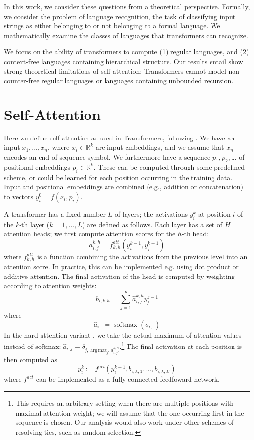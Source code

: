 \documentclass[11pt,a4paper]{article}
\DeclareMathOperator*{\argmax}{arg\,max}
\begin{document}
In this work, we consider these questions from a theoretical perspective.
Formally, we consider the problem of language recognition, the task of classifying input strings as either belonging to or not belonging to a formal language.
We mathematically examine the classes of languages that transformers can recognize.

We focus on the ability of transformers to compute (1) regular languages, and (2) context-free languages containing hierarchical structure.
Our results entail show strong theoretical limitations of self-attention:
Transformers cannot model non-counter-free regular languages or languages containing unbounded recursion.


\section{Self-Attention}
Here we define self-attention as used in Transformers, following \cite{vaswani2017attention}.
We have an input $x_1,...,x_n$, where $x_i \in \mathbb{R}^k$ are input embeddings, and we assume that $x_n$ encodes an end-of-sequence symbol.
We furthermore have a sequence $p_1, p_2, ...$ of positional embeddings $p_i \in \mathbb{R}^k$. These can be computed through some predefined scheme, or could be learned for each position occurring in the training data.
Input and positional embeddings are combined (e.g., addition or concatenation) to vectors $y_i^0 = f(x_i, p_i)$.

A transformer has a fixed number $L$ of layers; the activations $y_i^k$ at position $i$ of the $k$-th layer ($k=1, ..., L$) are defined as follows.
Each layer has a set of $H$ attention heads; we first compute attention scores for the $h$-th head:
\begin{equation}
    a_{i,j}^{k,h} = f^{att}_{k,h}(y_i^{k-1}, y_j^{k-1})
\end{equation}
where $f^{att}_{k,h}$ is a function combining the activations from the previous level into an attention score.
In practice, this can be implemented e.g. using dot product or additive attention.
The final activation of the head is computed by weighting according to attention weights:
\begin{equation}
    b_{i,k,h} = \sum_{j=1}^n \hat{a}_{i,j}^{k,h} y_j^{k-1}
\end{equation}
where $$ \hat{a}_{i,\cdot} = \operatorname{softmax}(a_{i,\cdot}) $$
In the hard attention variant \cite{perez2019turing} , we take the actual maximum of attention values instead of softmax:
$\hat{a}_{i,j} = \delta_{j, \argmax_{j'} a_{i,j'}^{k,h}}$.\footnote{This requires an arbitrary setting when there are multiple positions with maximal attention weight; we will assume that the one occurring first in the sequence is chosen. Our analysis would also work under other schemes of resolving ties, such as random selection.}
The final activation at each position is then computed as
\begin{equation}
    y_i^k := f^{act}(y_i^{k-1}, b_{i,k,1}, ..., b_{i,k,H})
\end{equation}
where $f^{act}$ can be implemented as a fully-connected feedfoward network.
\end{document}
